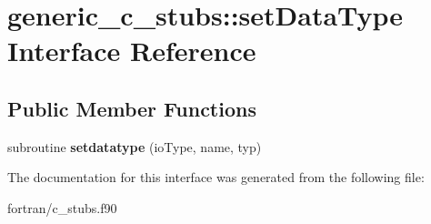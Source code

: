 \hypertarget{interfacegeneric__c__stubs_1_1set_data_type}{}\section{generic\+\_\+c\+\_\+stubs\+:\+:set\+Data\+Type Interface Reference}
\label{interfacegeneric__c__stubs_1_1set_data_type}
\subsection*{Public Member Functions}
\begin{DoxyCompactItemize}
\item 
\mbox{\label{interfacegeneric__c__stubs_1_1set_data_type_adea0c571ad17526e38f67ba7056988dc}} 
subroutine {\bfseries setdatatype} (io\+Type, name, typ)
\end{DoxyCompactItemize}


The documentation for this interface was generated from the following file\+:\begin{DoxyCompactItemize}
\item 
fortran/c\+\_\+stubs.\+f90\end{DoxyCompactItemize}
